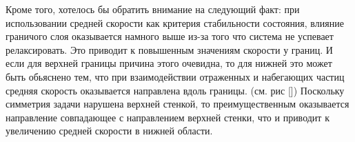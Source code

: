         Кроме того, хотелось бы обратить внимание на следующий факт: при использовании средней скорости как критерия стабильности состояния, влияние граничого слоя оказывается намного выше из-за того что система не успевает релаксировать. Это приводит к повышенным значениям скорости у границ. И если для верхней границы причина этого очевидна, то для нижней это может быть обьяснено тем, что при взаимодействии отраженных и набегающих частиц средняя скорость оказывается направлена вдоль границы. (см. рис []) Поскольку симметрия задачи нарушена верхней стенкой, то преимущественным оказывается направление совпадающее с направлением верхней стенки, что и приводит к увеличению средней скорости в нижней области.
    
